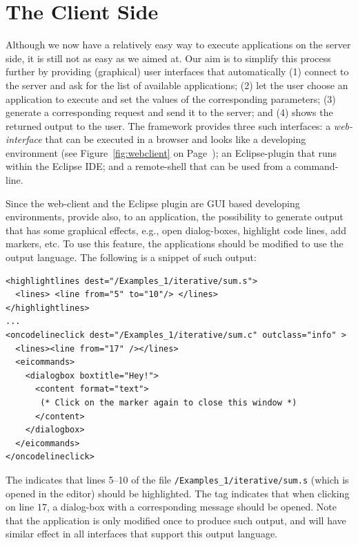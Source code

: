 \section{The Client Side}
\label{ch:overview:arch:client}


Although we now have a relatively easy way to execute applications on
the server side, it is still not as easy as we aimed at.
%
Our aim is to simplify this process further by providing (graphical)
user interfaces that automatically (1) connect to the \ei server and
ask for the list of available applications; (2) let the user choose an
application to execute and set the values of the corresponding
parameters; (3) generate a corresponding request and send it to the
\ei server; and (4) shows the returned output to the user.
%
The \ei framework provides three such interfaces: a
\emph{web-interface} that can be executed in a browser and looks like
a developing environment (see Figure~\ref{fig:webclient} on
Page~\pageref{fig:webclient}); an Eclipse-plugin that runs within the
Eclipse IDE; and a remote-shell that can be used from a command-line.

Since the web-client and the Eclipse plugin are GUI based developing
environments, \ei provide also, to an application, the possibility to
generate output that has some graphical effects, e.g., open
dialog-boxes, highlight code lines, add markers, etc. To use this
feature, the applications should be modified to use the \ei output
language. The following is a snippet of such output:

\medskip
\begin{lstlisting}
<highlightlines dest="/Examples_1/iterative/sum.s"> 
  <lines> <line from="5" to="10"/> </lines>
</highlightlines>
...
<oncodelineclick dest="/Examples_1/iterative/sum.c" outclass="info" >
  <lines><line from="17" /></lines>
  <eicommands>
    <dialogbox boxtitle="Hey!"> 
      <content format="text">
       (* Click on the marker again to close this window *)
      </content>
    </dialogbox>
  </eicommands>
</oncodelineclick>

\end{lstlisting}

\medskip
\noindent
The  indicates that lines 5--10 of the file
\texttt{/Examples\_1/iterative/sum.s} (which is opened in the editor)
should be highlighted. The  tag indicates that
when clicking on line $17$, a dialog-box with a corresponding message
should be opened.
%
Note that the application is only modified once to produce such
output, and will have similar effect in all interfaces that support
this output language.

